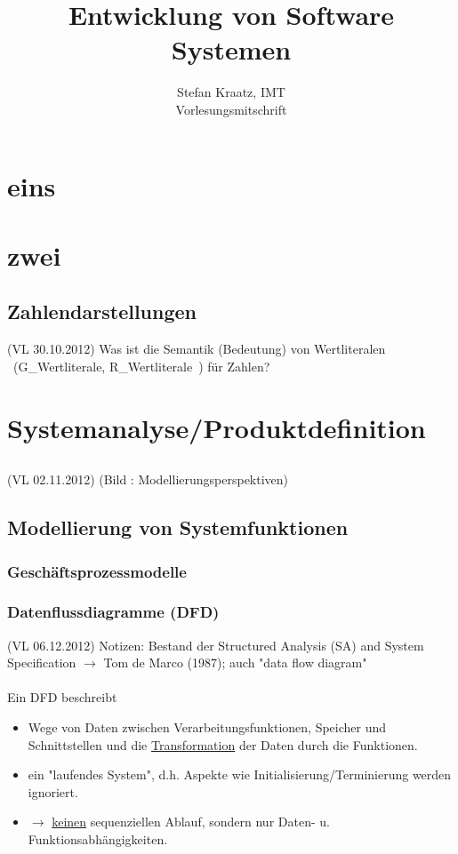 \documentclass[10pt,a4paper]{book}
\author{Stefan Kraatz, IMT\\Vorlesungsmitschrift}
\title{Entwicklung von Software Systemen}
\begin{document}
\maketitle
\chapter{eins}
\chapter{zwei}
\section{}
\section{}
\section{Zahlendarstellungen}
(VL 30.10.2012) Was ist die Semantik (Bedeutung) von Wertliteralen \ (G\_Wertliterale, R\_Wertliterale\ ) für Zahlen?
\chapter{Systemanalyse/Produktdefinition}
\section{}
(VL 02.11.2012) (Bild : Modellierungsperspektiven) 
\section{Modellierung von Systemfunktionen}
\subsection{Geschäftsprozessmodelle}
\subsection{Datenflussdiagramme (DFD)}
(VL 06.12.2012)
Notizen: Bestand der Structured Analysis (SA) and System Specification $\rightarrow$ Tom de Marco (1987); auch "data flow diagram"
\\
\\
Ein DFD beschreibt
\begin{itemize}
  \item Wege von Daten zwischen Verarbeitungsfunktionen, Speicher und Schnittstellen und die \underline{Transformation} der Daten durch die Funktionen.
  \item ein "laufendes System", d.h. Aspekte wie Initialisierung/Terminierung werden ignoriert.
  \item $\rightarrow$ \underline{keinen} sequenziellen Ablauf, sondern nur Daten- u. Funktionsabhängigkeiten.
\end{itemize}
\end{document}
